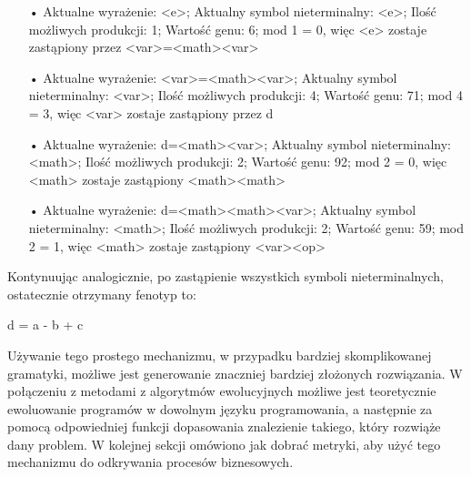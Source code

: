 \begin{itemize}
  \item[•] Aktualne wyrażenie: <e>; \newline
Aktualny symbol nieterminalny: <e>; \newline
Ilość możliwych produkcji: 1; \newline
Wartość genu: 6;  mod 1 = 0, więc <e> zostaje zastąpiony przez <var>=<math><var>
  \item[•] Aktualne wyrażenie: <var>=<math><var>; \newline
Aktualny symbol nieterminalny: <var>; \newline
Ilość możliwych produkcji: 4; \newline
Wartość genu: 71;  mod 4 = 3, więc <var> zostaje zastąpiony przez d
  \item[•] Aktualne wyrażenie: d=<math><var>; \newline
Aktualny symbol nieterminalny: <math>; \newline
Ilość możliwych produkcji: 2; \newline
Wartość genu: 92;  mod 2 = 0, więc <math> zostaje zastąpiony <math><math>
  \item[•] Aktualne wyrażenie: d=<math><math><var>; \newline
Aktualny symbol nieterminalny: <math>; \newline
Ilość możliwych produkcji: 2; \newline
Wartość genu: 59;  mod 2 = 1, więc <math> zostaje zastąpiony <var><op>
\end{itemize}
Kontynuując analogicznie, po zastąpienie wszystkich symboli nieterminalnych, ostatecznie otrzymany fenotyp to:
\begin{center} d = a - b + c \end{center}	
Używanie tego prostego mechanizmu, w przypadku bardziej skomplikowanej gramatyki, możliwe jest generowanie znaczniej bardziej złożonych rozwiązania. W połączeniu z metodami z algorytmów ewolucyjnych możliwe jest teoretycznie ewoluowanie programów w dowolnym języku programowania, a następnie za pomocą odpowiedniej funkcji dopasowania znalezienie takiego, który rozwiąże dany problem. W kolejnej sekcji omówiono jak dobrać metryki, aby użyć tego mechanizmu do odkrywania procesów biznesowych.



